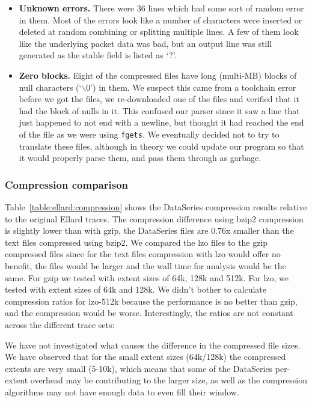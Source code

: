 \begin{itemize}
\item {\bf Unknown errors.} There were 36 lines which had some sort of
random error in them.  Most of the errors look like a number of
characters were inserted or deleted at random combining or splitting
multiple lines.  A few of them look like the underlying packet data
was bad, but an output line was still generated as the stable field is
listed as `?'.

\item {\bf Zero blocks.} Eight of the compressed files have long
(multi-MB) blocks of null characters (`$\backslash0$') in them.  We
suspect this came from a toolchain error before we got the files, we
re-downloaded one of the files and verified that it had the block of
nulls in it.  This confused our parser since it saw a line that just
happened to not end with a newline, but thought it had reached the end
of the file as we were using \texttt{fgets}.  We eventually decided
not to try to translate these files, although in theory we could
update our program so that it would properly parse them, and pass them
through as garbage.

\end{itemize}

\subsubsection{Compression comparison}

Table~\ref{table:ellard:compression} shows the DataSeries compression results
relative to the original Ellard traces.  The compression difference
using bzip2 compression is slightly lower than with gzip, the
DataSeries files are 0.76x smaller than the text files compressed
using bzip2.  We compared the lzo files to the gzip compressed files
since for the text files compression with lzo would offer no benefit,
the files would be larger and the wall time for analysis would be the
same.  For gzip we tested with extent sizes of 64k, 128k and 512k.
For lzo, we tested with extent sizes of 64k and 128k.  We didn't
bother to calculate compression ratios for lzo-512k because the
performance is no better than gzip, and the compression would be
worse.  Interestingly, the ratios are not constant across the
different trace sets:

We have not investigated what causes the difference in the compressed
file sizes.  We have observed that for the small extent sizes
(64k/128k) the compressed extents are very small (5-10k), which means
that some of the DataSeries per-extent overhead may be contributing to
the larger size, as well as the compression algorithms may not have
enough data to even fill their window.

